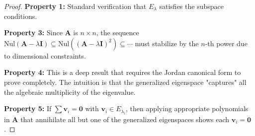 \documentclass[12pt]{article}
\numberwithin{equation}{section}
\newcommand{\vect}[1]{\boldsymbol{#1}}   %
\newcommand{\mat}[1]{\mathbf{#1}}        %
\theoremstyle{plain}
\theoremstyle{definition}
\theoremstyle{remark}
\begin{document}
\begin{proof}
\textbf{Property 1:} Standard verification that $E_{\lambda}$ satisfies the subspace conditions.

\textbf{Property 3:} Since $\mat{A}$ is $n \times n$, the sequence $\text{Nul}(\mat{A} - \lambda\mat{I}) \subseteq \text{Nul}((\mat{A} - \lambda\mat{I})^2) \subseteq \cdots$ must stabilize by the $n$-th power due to dimensional constraints.

\textbf{Property 4:} This is a deep result that requires the Jordan canonical form to prove completely. The intuition is that the generalized eigenspace "captures" all the algebraic multiplicity of the eigenvalue.

\textbf{Property 5:} If $\sum \vect{v}_i = \vect{0}$ with $\vect{v}_i \in E_{\lambda_i}$, then applying appropriate polynomials in $\mat{A}$ that annihilate all but one of the generalized eigenspaces shows each $\vect{v}_i = \vect{0}$.
\end{proof}
\end{document}
